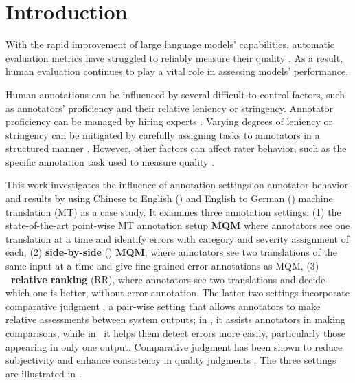 \section{Introduction}\label{sec:intro}
With the rapid improvement of large language models' capabilities, automatic evaluation metrics have struggled to reliably measure their quality \citep{karpinska-iyyer-2023-large, pham2024suri}. As a result, human evaluation continues to play a vital role in assessing models' performance.

Human annotations can be influenced by several difficult-to-control factors, such as annotators' proficiency and their relative leniency or stringency. Annotator proficiency can be managed by hiring experts \citep{karpinska-etal-2021-perils, krishna-etal-2023-longeval}. Varying degrees of leniency or stringency can be mitigated by carefully assigning tasks to annotators in a structured manner \citep{riley-etal-2024-finding}. 
However, other factors can affect rater behavior, such as the specific annotation task used to measure quality \cite{belz-kow-2010-comparing}.


This work investigates the influence of annotation settings on annotator behavior and results by using Chinese to English (\ZhEn) and English to German (\EnDe) machine translation (MT) as a case study. It examines three annotation settings: (1) the state-of-the-art point-wise MT annotation setup \textbf{MQM} \citep{lommel2014mqm, freitag-etal-2021-experts} where annotators see one translation at a time and identify errors with category and severity assignment of each, (2) \textbf{side-by-side} (\sxs) \textbf{MQM}, where annotators see two translations of the same input at a time and give fine-grained error annotations as MQM, (3) \textbf{\sxs~relative ranking} (RR), where annotators see two translations and decide which one is better, without error annotation. The latter two settings incorporate comparative judgment \citep{LCJ1927}, a pair-wise setting that allows annotators to make relative assessments between system outputs; in \sxsqr, it assists annotators in making comparisons, while in \sxsmqm~it helps them detect errors more easily, particularly those appearing in only one output. Comparative judgment has been shown to reduce subjectivity and enhance consistency in quality judgments \citep{karpinska-etal-2021-perils, de-Moira-2022, Jones-2024}. The three settings are illustrated in .

